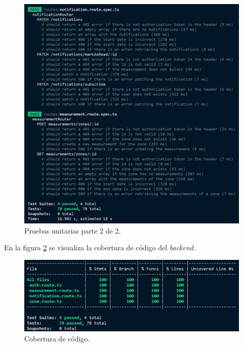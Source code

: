 \begin{figure}[H]
	\centering
	\includegraphics[width=.9\textwidth]{./Figures/Backend unit testing 2.png}
	\caption{Pruebas unitarias parte 2 de 2.}
	\label{fig:unitTestingBackend2}
\end{figure}


En la figura \ref{fig:codeCoverageBackend} se visualiza la cobertura de código del \emph{backend}.

\begin{figure}[H]
	\centering
	\includegraphics[width=1.00\textwidth, height=0.45\linewidth]{./Figures/Backend code coverage.png}
	\caption{Cobertura de código.}
	\label{fig:codeCoverageBackend}
\end{figure}

